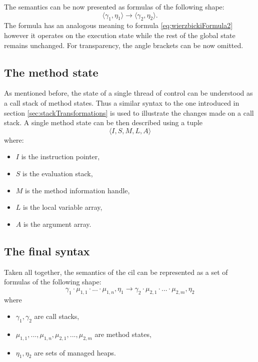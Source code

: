 \documentclass{article}
\numberwithin{equation}{section}
\newcommand{\mstate}[5] {
	\langle#1, #2, #3, #4, #5\rangle
}
\begin{document}
The semantics can be now presented as formulas of the following shape:
\begin{equation}
\label{eq:simpleSemantics}
	\langle\gamma_1, \eta_1\rangle \rightarrow \langle\gamma_2, \eta_2\rangle.
\end{equation}
The formula has an analogous meaning to formula \ref{eq:wierzbickiFormula2} however it operates on the execution state while the rest of the global state remains unchanged. For transparency, the angle brackets can be now omitted.

\subsection{The method state}

As mentioned before, the state of a single thread of control can be understood as a call stack of method states. Thus a similar syntax to the one introduced in section \ref{sec:stackTransformations} is used to illustrate the changes made on a call stack. A single method state can be then described using a tuple
\begin{equation}
\label{eq:methodState}
	\mstate{I}{S}{M}{L}{A}
\end{equation}
where:
\begin{itemize}
	\item{$I$ is the instruction pointer},
	\item{$S$ is the evaluation stack},
	\item{$M$ is the method information handle},
	\item{$L$ is the local variable array},
	\item{$A$ is the argument array}.
\end{itemize}

\subsection{The final syntax}

Taken all together, the semantics of the \acrshort{cil} can be represented as a set of formulas of the following shape:
\begin{equation}
\label{eq:finalSyntax}
	\gamma_1 \cdot \mu_{1,1} \cdot ... \cdot \mu_{1,n}, \eta_1 \rightarrow \gamma_2 \cdot \mu_{2,1} \cdot ... \cdot \mu_{2,m}, \eta_2
\end{equation}
where
\begin{itemize}
	\item{$\gamma_1, \gamma_2$ are call stacks,}
	\item{$\mu_{1,1}, ..., \mu_{1,n}, \mu_{2, 1}, ..., \mu_{2, m}$ are method states,}
	\item{$\eta_1, \eta_2$ are sets of managed heaps.}
\end{itemize}
\end{document}
